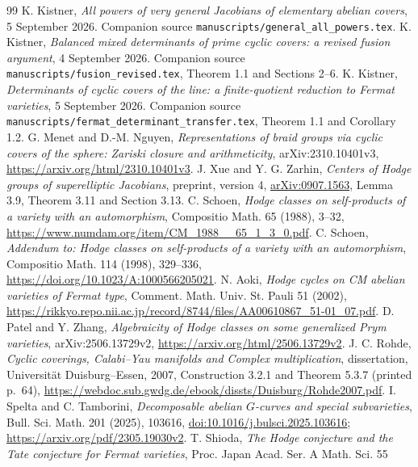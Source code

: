 \documentclass[11pt]{article}
\theoremstyle{definition}
\begin{document}
\begin{thebibliography}{99}
 K. Kistner, \emph{All powers of very general Jacobians of
elementary abelian covers}, 5 September 2026. Companion source
\nolinkurl{manuscripts/general_all_powers.tex}.
 K. Kistner, \emph{Balanced mixed determinants of prime
cyclic covers: a revised fusion argument}, 4 September 2026. Companion
source \texttt{manuscripts/fusion\_revised.tex}, Theorem 1.1 and Sections 2--6.
 K. Kistner, \emph{Determinants of cyclic covers of the line:
a finite-quotient reduction to Fermat varieties}, 5 September 2026.
Companion source \nolinkurl{manuscripts/fermat_determinant_transfer.tex},
Theorem 1.1 and Corollary 1.2.
 G. Menet and D.-M. Nguyen, \emph{Representations of braid groups
via cyclic covers of the sphere: Zariski closure and arithmeticity},
arXiv:2310.10401v3, \url{https://arxiv.org/html/2310.10401v3}.
 J. Xue and Y. G. Zarhin, \emph{Centers of Hodge groups of
superelliptic Jacobians}, preprint, version 4,
\href{https://arxiv.org/pdf/0907.1563}{arXiv:0907.1563},
Lemma 3.9, Theorem 3.11 and Section 3.13.
 C. Schoen, \emph{Hodge classes on self-products of a variety
with an automorphism}, Compositio Math. 65 (1988), 3--32,
\url{https://www.numdam.org/item/CM_1988__65_1_3_0.pdf}.
 C. Schoen, \emph{Addendum to: Hodge classes on
self-products of a variety with an automorphism}, Compositio Math. 114
(1998), 329--336, \url{https://doi.org/10.1023/A:1000566205021}.
 N. Aoki, \emph{Hodge cycles on CM abelian varieties of
Fermat type}, Comment. Math. Univ. St. Pauli 51 (2002),
\url{https://rikkyo.repo.nii.ac.jp/record/8744/files/AA00610867_51-01_07.pdf}.
 D. Patel and Y. Zhang, \emph{Algebraicity of Hodge classes on
some generalized Prym varieties}, arXiv:2506.13729v2,
\url{https://arxiv.org/html/2506.13729v2}.
 J. C. Rohde, \emph{Cyclic coverings, Calabi--Yau manifolds
and Complex multiplication}, dissertation, Universit\"at Duisburg--Essen,
2007, Construction 3.2.1 and Theorem 5.3.7 (printed p.\ 64),
\url{https://webdoc.sub.gwdg.de/ebook/dissts/Duisburg/Rohde2007.pdf}.
 I. Spelta and C. Tamborini, \emph{Decomposable abelian
$G$-curves and special subvarieties}, Bull. Sci. Math. 201 (2025), 103616,
\href{https://doi.org/10.1016/j.bulsci.2025.103616}{doi:10.1016/j.bulsci.2025.103616};
\url{https://arxiv.org/pdf/2305.19030v2}.
 T. Shioda, \emph{The Hodge conjecture and the Tate
conjecture for Fermat varieties}, Proc. Japan Acad. Ser. A Math. Sci. 55

\end{thebibliography}
\end{document}
